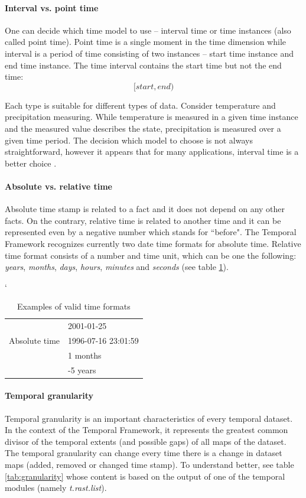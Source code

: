 \documentclass[a4paper,12pt,oneside]{book}
\newcommand{\module}[1]{\textsl{#1}}
\newcommand{\tf}{Temporal Framework\xspace}
\begin{document}
\paragraph{Interval vs. point time}
\label{sec:intervalVsPoint}
One can decide which time model to use -- interval time or time instances (also called point time).
Point time is a single moment in the time dimension
while interval is a period of time consisting of two instances -- start time instance and end time instance.
The time interval contains the start time but not the end time:
$$[start, end)$$

Each type is suitable for different types of data.
Consider temperature and precipitation measuring.
While temperature is measured in a given time instance and the measured value describes the state,
precipitation is measured over a given time period. The decision which model to choose is not always
straightforward, however it appears that for many applications,
interval time is a better choice \cite{pointVsInterval}.

\paragraph{Absolute vs. relative time}
\label{sec:absoluteVsRelative}
Absolute time stamp is related to a fact and it does not depend on any other facts.
On the contrary, relative time is related to another time and
it can be represented even by a negative number which stands for ``before".
The \tf recognizes currently two date time formats for absolute time.
Relative time format consists of a number and time unit, which can be one the following: \emph{years},
\emph{months}, \emph{days}, \emph{hours}, \emph{minutes} and \emph{seconds} (see table \ref{tab:timeFormat}).

\begin{table}[ht!]
  \centering
  \catcode`
\caption{Examples of valid time formats}
\label{tab:timeFormat}
\setlength{\extrarowheight}{3pt}
\begin{tabular}{|l|l|}
\hline
\multirow{3}{*}{Absolute time}
 & 2001-01-25  \\ \cline{2-2}
 & 1996-07-16 23:01:59  \\\cline{2-2}
 \hline
\multirow{2}{*}{Relative time}
 & 1 months  \\\cline{2-2}
 & -5 years  \\
 \hline
\end{tabular}
\end{table}

\paragraph{Temporal granularity}
\label{sec:temporalGranularity}
Temporal granularity is an important characteristics of every temporal dataset.
In the context of the \tf , it represents the greatest common divisor
of the temporal extents (and possible gaps) of all maps of the dataset.
The temporal granularity can change every time there is a change in dataset maps
(added, removed or changed time stamp).
To understand better, see table \ref{tab:granularity} whose content is based on the output
of one of the temporal modules (namely \module{t.rast.list}).
\end{document}

